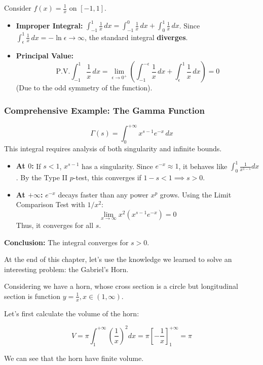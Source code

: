 \documentclass[oneside]{book}
\begin{document}
\begin{example}
Consider $f(x) = \frac{1}{x}$ on $[-1, 1]$.
\begin{itemize}
    \item \textbf{Improper Integral:} $\int_{-1}^1 \frac{1}{x} \, dx = \int_{-1}^0 \frac{1}{x} \, dx + \int_0^1 \frac{1}{x} \, dx$.
    Since $\int_{\epsilon}^1 \frac{1}{x} \, dx = -\ln \epsilon \to \infty$, the standard integral \textbf{diverges}.
    \item \textbf{Principal Value:}
    \[
    \text{P.V.} \int_{-1}^1 \frac{1}{x} \, dx = \lim_{\epsilon \to 0^+} \left( \int_{-1}^{-\epsilon} \frac{1}{x} \, dx + \int_{\epsilon}^1 \frac{1}{x} \, dx \right) = 0
    \]
    (Due to the odd symmetry of the function).
\end{itemize}
\end{example}

\subsubsection{Comprehensive Example: The Gamma Function}
\[
\Gamma(s) = \int_0^{+\infty} x^{s-1} e^{-x} \, dx
\]
This integral requires analysis of both singularity and infinite bounds.
\begin{itemize}
    \item \textbf{At $0$:} If $s < 1$, $x^{s-1}$ has a singularity. Since $e^{-x} \approx 1$, it behaves like $\int_0^1 \frac{1}{x^{1-s}} dx$. By the Type II $p$-test, this converges if $1-s < 1 \implies s > 0$.
    \item \textbf{At $+\infty$:} $e^{-x}$ decays faster than any power $x^p$ grows. Using the Limit Comparison Test with $1/x^2$:
    \[
    \lim_{x \to \infty} x^2 (x^{s-1} e^{-x}) = 0
    \]
    Thus, it converges for all $s$.
\end{itemize}
\textbf{Conclusion:} The integral converges for $s > 0$.

At the end of this chapter, let's use the knowledge we learned to solve an interesting problem: the Gabriel's Horn.

Considering we have a horn, whose cross section is a circle but longitudinal section is function $y = \frac{1}{x}, x \in (1,\infty)$.

Let's first calculate the volume of the horn:

\[V = \pi \int_{1}^{+\infty} (\frac{1}{x})^2 dx = \pi [-\frac{1}{x}]_{1}^{+\infty} = \pi\]

We can see that the horn have finite volume.
\end{document}
